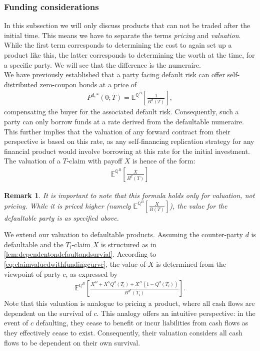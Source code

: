 \documentclass[12pt]{article}
\newtheorem{remark}[theorem]{Remark}
\begin{document}
	\subsubsection{Funding considerations}\label{sec:fundingconsiderations}
	In this subsection we will only discuss products that can not be traded after the initial time. This means we have to separate the terms \emph{pricing} and \emph{valuation}. While the first term corresponds to determining the cost to again set up a product like this, the latter corresponds to determining the worth at the time, for a specific party. We will see that the difference is the numeraire.\\
	We have previously established that a party facing default risk can offer self-distributed zero-coupon bonds at a price of
	\begin{align*}
		P^{d,*}(0;T) = \mathbb{E}^{\mathbb{Q}^B}\left[\frac{1}{B^d(T)}\right],
	\end{align*}
	compensating the buyer for the associated default risk. Consequently, such a party can only borrow funds at a rate derived from the defaultable numeraire. This further implies that the valuation of any forward contract from their perspective is based on this rate, as any self-financing replication strategy for any financial product would involve borrowing at this rate for the initial investment. The valuation of a $T$-claim with payoff $X$ is hence of the form:
	\begin{align}\label{eq:claimvaluedwithfundingcurve}
		\mathbb{E}^{\mathbb{Q}^B}\left[\frac{X}{B^d(T)}\right]
	\end{align}
	\begin{remark}
		It is important to note that this formula holds only for valuation, not pricing. While it is priced higher (namely $\mathbb{E}^{\mathbb{Q}^B}\left[\frac{X}{B(T)}\right]$), the value for the defaultable party is as specified above.
	\end{remark}
	We extend our valuation to defaultable products. Assuming the counter-party $d$ is defaultable and the $T_i$-claim $X$ is structured as in \cref{lem:dependentondefaultandsurvial}. According to \cref{eq:claimvaluedwithfundingcurve}, the value of $X$ is determined from the viewpoint of party $c$, as expressed by
	\begin{align*}
		\mathbb{E}^{\mathbb{Q}^B}\left[ \frac{X^O + X^S Q^d(T_i) + X^D \left(1 - Q^d(T_i)\right)}{B^{d^c}(T_i)} \right].
	\end{align*}
	Note that this valuation is analogue to pricing a product, where all cash flows are dependent on the survival of $c$. This analogy offers an intuitive perspective: in the event of $c$ defaulting, they cease to benefit or incur liabilities from cash flows as they effectively cease to exist. Consequently, their valuation considers all cash flows to be dependent on their own survival.\\
	
\end{document}
